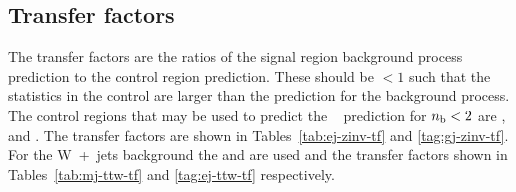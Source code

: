 \begin{table}[h]
\begin{tabular}
\hline\hline
  \end{tabular}
\end{table}

\subsection{Transfer factors}

The transfer factors are the ratios of the signal region background process
prediction to the control region prediction. These should be $\lt 1$ such that 
the statistics in the control are larger than the prediction for the background
process. The control regions that may be used to predict the \zInv~ prediction for $n_{\text{b}} < 2$ are
\mj, \ej and \gj. The transfer factors are shown in Tables~\ref{tab:ej-zinv-tf} and \ref{tag:gj-zinv-tf}. 
For the W~+~jets background the \mj and \ej are used and the transfer factors shown in 
Tables~\ref{tab:mj-ttw-tf} and \ref{tag:ej-ttw-tf} respectively.


